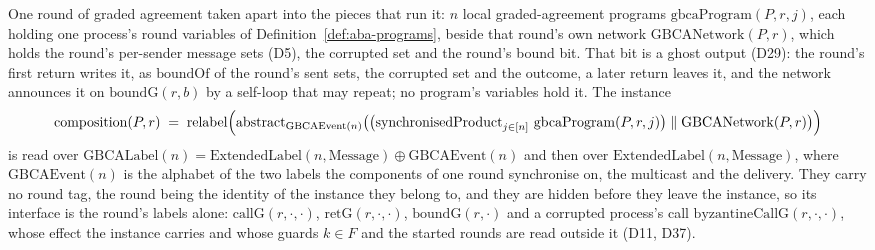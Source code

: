 \begin{definition}
  \label{def:aba-gbca-instance-by-abdy}
  \leanok
  One round of graded agreement taken apart into the pieces that run it: $n$ local graded-agreement programs $\mathrm{gbcaProgram}(P,r,j)$, each holding one process's round variables of Definition~\ref{def:aba-programs}, beside that round's own network $\mathrm{GBCANetwork}(P,r)$, which holds the round's per-sender message sets (D5), the corrupted set and the round's bound bit.
  That bit is a ghost output (D29): the round's first return writes it, as $\mathrm{boundOf}$ of the round's sent sets, the corrupted set and the outcome, a later return leaves it, and the network announces it on $\mathrm{boundG}(r,b)$ by a self-loop that may repeat; no program's variables hold it.
  The instance
  \[
    \mathrm{composition}(P,r) \;=\; \mathrm{relabel}\Bigl(
      \mathrm{abstract}_{\mathrm{GBCAEvent}(n)}\bigl(
        \bigl(\mathrm{synchronisedProduct}_{j \in [n]}\ \mathrm{gbcaProgram}(P,r,j)\bigr)
          \parallel \mathrm{GBCANetwork}(P,r)\bigr)\Bigr)
  \]
  is read over $\mathrm{GBCALabel}(n) = \mathrm{ExtendedLabel}(n, \mathrm{Message}) \oplus \mathrm{GBCAEvent}(n)$ and then over $\mathrm{ExtendedLabel}(n, \mathrm{Message})$, where $\mathrm{GBCAEvent}(n)$ is the alphabet of the two labels the components of one round synchronise on, the multicast and the delivery.
  They carry no round tag, the round being the identity of the instance they belong to, and they are hidden before they leave the instance, so its interface is the round's labels alone: $\mathrm{callG}(r,\cdot,\cdot)$, $\mathrm{retG}(r,\cdot,\cdot)$, $\mathrm{boundG}(r,\cdot)$ and a corrupted process's call $\mathrm{byzantineCallG}(r,\cdot,\cdot)$, whose effect the instance carries and whose guards $k \in F$ and the started rounds are read outside it (D11, D37).

\end{definition}
